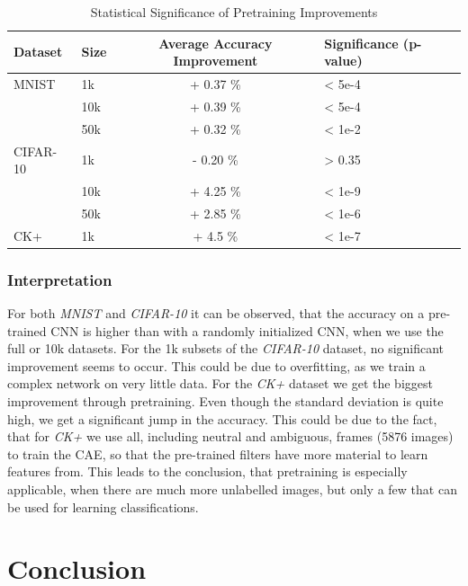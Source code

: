 \documentclass{article}
\begin{document}
    \begin{table}
      \caption{Statistical Significance of Pretraining Improvements}
      \label{table:significance}
      \centering
      \begin{tabular}{llcl}
        \toprule
        Dataset     & Size    & Average Accuracy Improvement & Significance (p-value) \\
        \midrule
        MNIST & 1k    & + 0.37 \%  & < 5e-4 \\
              & 10k   & + 0.39 \%  & < 5e-4 \\
              & 50k   & + 0.32 \%  & < 1e-2 \\
        \midrule
        CIFAR-10  & 1k    & - 0.20 \% & > 0.35\\
                  & 10k   & + 4.25 \% & < 1e-9\\
                  & 50k   & + 2.85 \% & < 1e-6\\
        \midrule
        CK+     & 1k & + 4.5 \%      & < 1e-7 \\
        \bottomrule
      \end{tabular}
    \end{table}

    \subsubsection{Interpretation}
      For both \emph{MNIST} and \emph{CIFAR-10} it can be observed, that the accuracy on a pre-trained CNN is higher than with a randomly initialized CNN, when we use the full or 10k datasets.
      For the 1k subsets of the \emph{CIFAR-10} dataset, no significant improvement seems to occur. This could be due to overfitting, as we train a complex network on very little data.
      For the \emph{CK+} dataset we get the biggest improvement through pretraining.
      Even though the standard deviation is quite high, we get a significant jump in the accuracy.
      This could be due to the fact, that for \emph{CK+} we use all, including neutral and ambiguous, frames (5876 images) to train the CAE, so that the pre-trained filters have more material to learn features from.
      This leads to the conclusion, that pretraining is especially applicable, when there are much more unlabelled images, but only a few that can be used for learning classifications.

\section{Conclusion}
\end{document}

